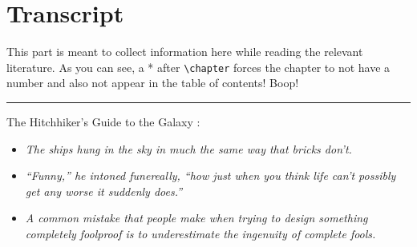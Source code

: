 \documentclass[../bachelor_paper.tex]{subfiles}
\begin{document}
\chapter{Transcript}
    This part is meant to collect information here while reading the relevant literature.
    As you can see, a * after \texttt{\textbackslash{}chapter} forces the chapter to not have a number and also not appear in the table of contents! Boop!
    
    
    
    \bigskip\hrule
    
    The Hitchhiker's Guide to the Galaxy \cite{adams2007hitchhiker}:
    \begin{itemize}
        \item \textit{The ships hung in the sky in much the same way that bricks don't.}
        \item \textit{``Funny,'' he intoned funereally, ``how just when you think life can’t possibly get any worse it suddenly does.''}
        \item \textit{A common mistake that people make when trying to design something completely foolproof is to underestimate the ingenuity of complete fools.}
    \end{itemize}
\end{document}
